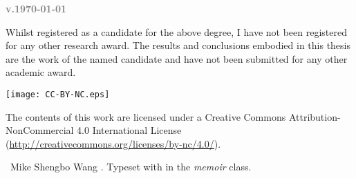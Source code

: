 %

\clearpage
\thispagestyle{empty}

\hypertarget{colophon}{}

\begin{colophon}

\ifdraftdoc
	\textcolor{gray}{\textbf{\ttfamily\bfseries v.\today}}
	\vfill
\else
    \null\vfill
\fi


\begin{minipage}{\textwidth}
    Whilst registered as a candidate for the above degree, I have not been registered for any other research award. The results and conclusions embodied in this thesis are the work of the named candidate and have not been submitted for any other academic award.

    \bigskip

    {}

    \bigskip\bigskip\bigskip

    \newdimen\licencewidth

    \begin{minipage}[c]{\licencewidth}
        \vspace{-3pt}\texttt{[image: CC-BY-NC.eps]}
    \end{minipage}%
    \hspace{1em}%
    \begin{minipage}{\textwidth-\licencewidth-1em}
        The contents of this work are licensed under a Creative Commons Attribution-NonCommercial 4.0 International License (\url{http://creativecommons.org/licenses/by-nc/4.0/}).
    \end{minipage}%
    \par

    \bigskip\smallskip

    \textcopyright\ Mike Shengbo Wang \copyrightyear. Typeset with {\XeLaTeX} in the \textit{memoir} class.
\end{minipage}

\end{colophon}

\clearpage

